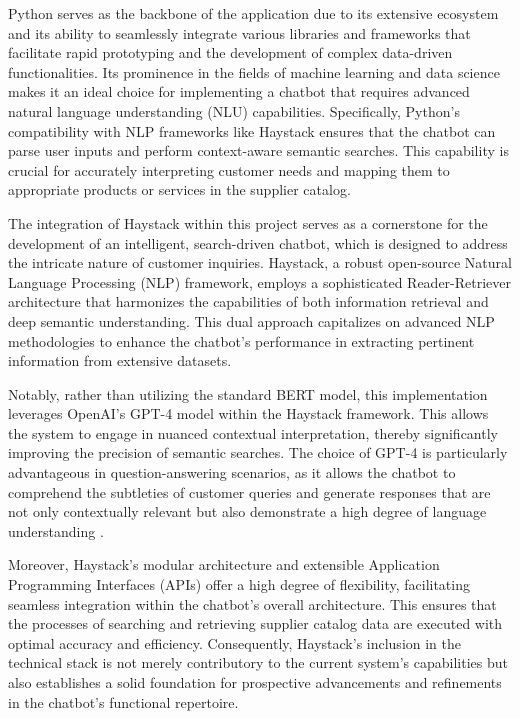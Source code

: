 
Python serves as the backbone of the application due to its extensive ecosystem and its ability to seamlessly integrate
various libraries and frameworks that facilitate rapid prototyping and the development of complex data-driven
functionalities. Its prominence in the fields of machine learning and data science makes it an ideal choice for
implementing a chatbot that requires advanced natural language understanding (NLU) capabilities. Specifically, Python's
compatibility with NLP frameworks like Haystack ensures that the chatbot can parse user inputs and perform context-aware
semantic searches. This capability is crucial for accurately interpreting customer needs and mapping them to appropriate
products or services in the supplier catalog.

The integration of Haystack within this project serves as a cornerstone for the development of an intelligent,
search-driven chatbot, which is designed to address the intricate nature of customer inquiries. Haystack, a robust
open-source Natural Language Processing (NLP) framework, employs a sophisticated Reader-Retriever architecture that
harmonizes the capabilities of both information retrieval and deep semantic understanding. This dual approach
capitalizes on advanced NLP methodologies to enhance the chatbot’s performance in extracting pertinent information from
extensive datasets\parencite[cf.][p.236]{krishnamoorthyEvolutionReadingComprehension2021}.

Notably, rather than utilizing the standard BERT model, this implementation leverages OpenAI’s GPT-4 model within the
Haystack framework. This allows the system to engage in nuanced contextual interpretation, thereby significantly
improving the precision of semantic searches. The choice of GPT-4 is particularly advantageous in question-answering
scenarios, as it allows the chatbot to comprehend the subtleties of customer queries and generate responses that are not
only contextually relevant but also demonstrate a high degree of language understanding
\autocite[cf.][p.943-944]{syedQuestionAnsweringChatbot2021}.

Moreover, Haystack’s modular architecture and extensible Application Programming Interfaces (APIs) offer a high degree
of flexibility, facilitating seamless integration within the chatbot’s overall architecture. This ensures that the
processes of searching and retrieving supplier catalog data are executed with optimal accuracy and efficiency.
Consequently, Haystack’s inclusion in the technical stack is not merely contributory to the current system’s
capabilities but also establishes a solid foundation for prospective advancements and refinements in the chatbot’s
functional repertoire.




